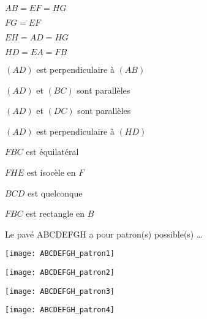 \begin{QCM}
\begin{GroupeQCM}
    
     \begin{exercice}
      \begin{ChoixQCM}{4}
      \item $AB = EF = HG$
      \item $FG = EF$
      \item $EH = AD = HG$
      \item $HD = EA = FB$
      \end{ChoixQCM}
\begin{corrige}
   \end{corrige}
    \end{exercice}
    
    
     \begin{exercice}
      \begin{ChoixQCM}{4}
      \item $(AD)$ est perpendiculaire à $(AB)$
      \item $(AD)$ et $(BC)$ sont parallèles
      \item $(AD)$ et $(DC)$ sont parallèles
      \item $(AD)$ est perpendiculaire à $(HD)$
      \end{ChoixQCM}
\begin{corrige}
   \end{corrige}
    \end{exercice}
    
    
     \begin{exercice}
      \begin{ChoixQCM}{4}
      \item $FBC$ est équilatéral
      \item $FHE$ est isocèle en $F$
      \item $BCD$ est quelconque
      \item $FBC$ est rectangle en $B$
      \end{ChoixQCM}
\begin{corrige}
   \end{corrige}
    \end{exercice}

    
    \begin{exercice}
      Le pavé ABCDEFGH a pour patron(s) possible(s) \ldots
      \begin{ChoixQCM}{4}
      \item \texttt{[image: ABCDEFGH\_patron1]}
      \item \texttt{[image: ABCDEFGH\_patron2]}
      \item \texttt{[image: ABCDEFGH\_patron3]}
      \item \texttt{[image: ABCDEFGH\_patron4]}
      \end{ChoixQCM}
\begin{corrige}
   \end{corrige}
    \end{exercice}
 \end{GroupeQCM}
\end{QCM}   
    
